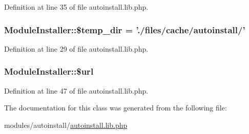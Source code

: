 Definition at line 35 of file autoinstall.\-lib.\-php.

\hypertarget{classModuleInstaller_a65850d513e6f6fdae18ee0654efb956c}{
\subsubsection[{\$temp\-\_\-dir}]{\setlength{\rightskip}{0pt plus 5cm}Module\-Installer\-::\$temp\-\_\-dir = './files/cache/{\bf autoinstall}/'}}\label{classModuleInstaller_a65850d513e6f6fdae18ee0654efb956c}


Definition at line 29 of file autoinstall.\-lib.\-php.

\hypertarget{classModuleInstaller_a01a6bf5f232c00fff146a58fb8c14b84}{
\subsubsection[{\$url}]{\setlength{\rightskip}{0pt plus 5cm}Module\-Installer\-::\$url}}\label{classModuleInstaller_a01a6bf5f232c00fff146a58fb8c14b84}


Definition at line 47 of file autoinstall.\-lib.\-php.



The documentation for this class was generated from the following file\-:\begin{DoxyCompactItemize}
\item 
modules/autoinstall/\hyperlink{autoinstall_8lib_8php}{autoinstall.\-lib.\-php}\end{DoxyCompactItemize}
